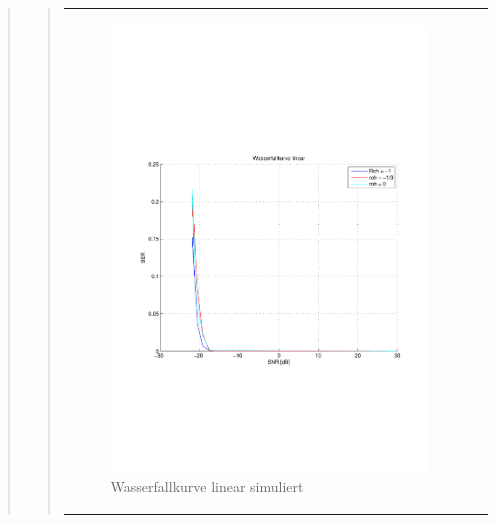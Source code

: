 \begin{quote}
\begin{quote}
\begin{center}
\begin{tabular}{ll}
\begin{minipage}{0.6\textwidth}
                        \begin{figure}[H]
                            \label{fig:}
                            \includegraphics[scale=0.45, trim = 1.5cm 7cm 1cm
                            8.5cm, clip]{./Bilder/aufgabe2/Wasserfallkurve_simuliert_linear}
                            \caption{Wasserfallkurve linear simuliert}
                        \end{figure}
    
                    \end{minipage}
                    \begin{minipage}{0.6\textwidth}
    

\end{minipage}
\end{tabular}
\end{center}
\end{quote}
\end{quote}
